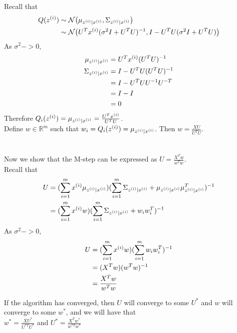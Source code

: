 \documentclass[11pt]{article}
\begin{document}
Recall that 
\begin{align*}
    Q(z^{(i)}) &\sim \mathcal{N}\big(\mu_{z^{(i)}|x^{(i)}}, \Sigma_{z^{(i)}|x^{(i)}} \big) \\
             &\sim \mathcal{N}\big(U^T x^{(i)} (\sigma^2 I + U^T U)^{-1}, I - U^T U (\sigma^2 I + U^T U) \big) \\
\end{align*}
As $\sigma^2 -> 0$,
\begin{align*}
    \mu_{z^{(i)}|x^{(i)}}    &= U^T x^{(i)} (U^T U)^{-1} \\
    \Sigma_{z^{(i)}|x^{(i)}} &= I - U^T U (U^T U)^{-1} \\
                         &= I - U^T U U^{-1} U^{-T} \\
                         &= I - I \\
                         &= 0 \\
\end{align*}
Therefore $Q_i(z^{(i)}) = \mu_{z^{(i)}|x^{(i)}} = \frac{U^T x^{(i)}}{U^T U}$. \\
Define $w \in \mathbb{R}^m$ such that $w_i = Q_i(z^{(i)}) = \mu_{z^{(i)}|x^{(i)}}$. Then $w = \frac{XU}{U^T U}$. \\
\\\\
Now we show that the M-step can be expressed as $U = \frac{X^T w}{w^T w}$. \\
Recall that 
\begin{align*}
    U &= (\sum_{i=1}^m x^{(i)} \mu_{z^{(i)}|x^{(i)}})(\sum_{i=1}^m \Sigma_{z^{(i)}|x^{(i)}} + \mu_{z^{(i)}|x^{(i)}} \mu_{z^{(i)}|x^{(i)}}^T)^{-1} \\
      &= (\sum_{i=1}^m x^{(i)} w)(\sum_{i=1}^m \Sigma_{z^{(i)}|x^{(i)}} + w_i w_i^T)^{-1} \\
\end{align*}
As $\sigma^2 -> 0$,
\begin{align*}
    U &= (\sum_{i=1}^m x^{(i)} w)(\sum_{i=1}^m w_i w_i^T)^{-1} \\
      &= (X^T w)(w^T w)^{-1} \\
      &= \frac{X^T w}{w^T w} \\
\end{align*}

If the algorithm has converged, then $U$ will converge to some $U^*$ and $w$ will converge to some $w^*$, and we will have that \\
$w^* = \frac{XU^*}{U^{*T}U^*}$ and $U^* = \frac{X^T w^*}{w^{*T} w^*}$\\
\end{document}
